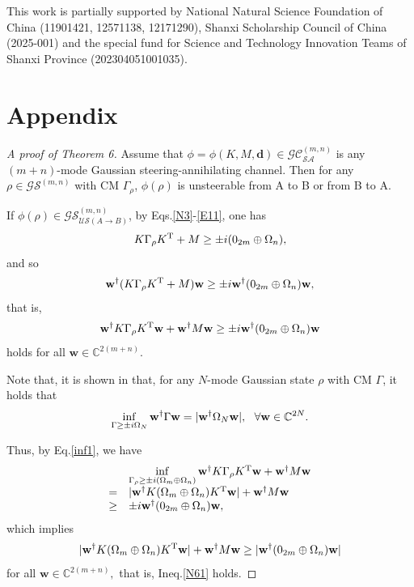 \documentclass[10pt,aps,pra,amsfonts,amssymb,amsmath,%
floatfix,nofootinbib, groupedaddress,superscriptaddress,citesort,twocolumn
]{revtex4}%
\begin{document}
This work is partially supported by National Natural Science Foundation of China (11901421, 12571138, 12171290), Shanxi Scholarship Council of China (2025-001) and the special fund for Science and Technology Innovation Teams of Shanxi	Province (202304051001035).

\section*{Appendix}

\begin{proof}[A proof of Theorem 6]
	Assume that $\phi =\phi\left( {K,M,\mathbf d} \right) \in {\mathcal {GC}}^{(m,n)}_{\mathcal {SA}}$ is any $(m+n)$-mode Gaussian steering-annihilating channel.  Then for any $\rho  \in {\mathcal {GS}}^{(m,n)} $ with CM $\Gamma_{\rho} $,
	$\phi(\rho)$ is unsteerable from A to B or from B to A.
	
	 If $\phi(\rho)\in {\mathcal {GS}}^{(m,n)}_{\mathcal {US}(A \rightarrow B)}$,  by  Eqs.\eqref{N3}-\eqref{E11},  one has %
	\begin{eqnarray*}\label{N62}
		K\Gamma_{\rho}K^{\rm T}+M  \ge  \pm i(0_{2m} \oplus \Omega_n),
	\end{eqnarray*}
	and so
		\begin{eqnarray*}
			\mathbf{w}^{\dag}(K\Gamma_{\rho}K^{\rm T}+M)\mathbf{w}  \ge \pm i\mathbf{w}^{\dag} (0_{2m} \oplus \Omega _n)\mathbf{w},
		\end{eqnarray*}
		that is,
	\begin{eqnarray*}
		\mathbf{w}^{\dag}K\Gamma_{\rho}K^{\rm T}\mathbf{w}+\mathbf{w}^{\dag}M\mathbf{w}  \ge \pm i\mathbf{w}^{\dag} (0_{2m} \oplus \Omega _n)\mathbf{w}
	\end{eqnarray*}
	holds  for all $ \mathbf{w} \in \mathbb{C}^{2(m+n)}$.
	
	Note that, it is shown in \cite{PMGH} that,  for any $N$-mode Gaussian state $\rho$ with  CM $\Gamma$, it holds that
	\begin{eqnarray}\label{inf1}	\inf\limits_{\Gamma\geq\pm i\Omega_N}{\bf w}^\dag\Gamma{\bf w}=|{\bf w}^\dag\Omega_N{\bf w}|,\ \ \forall  \mathbf{w} \in \mathbb{C}^{2N}.\end{eqnarray}
	
	Thus, by Eq.\eqref{inf1}, we have
	$$	\begin{array}{rl}
		&\inf\limits_{\Gamma_\rho\geq\pm i(\Omega_{m} \oplus \Omega _n)}	\mathbf{w}^{\dag}K\Gamma_{\rho}K^{\rm T}\mathbf{w}+\mathbf{w}^{\dag}M\mathbf{w} \\
		=&|\mathbf{w}^{\dag}K(\Omega_{m} \oplus \Omega _n)K^{\rm T}\mathbf{w}|+\mathbf{w}^{\dag}M\mathbf{w} \\
		\ge& \pm i\mathbf{w}^{\dag} (0_{2m} \oplus \Omega _n)\mathbf{w},
	\end{array}$$
	which implies
	$$|\mathbf{w}^{\dag}K(\Omega_{m} \oplus \Omega _n)K^{\rm T}\mathbf{w}|+\mathbf{w}^{\dag}M\mathbf{w}  \ge |\mathbf{w}^{\dag} (0_{2m} \oplus \Omega _n)\mathbf{w}|$$ for all $\mathbf{w} \in \mathbb{C}^{2(m+n)},$
	that is, Ineq.\eqref{N61} holds.
	

\end{proof}
\end{document}
